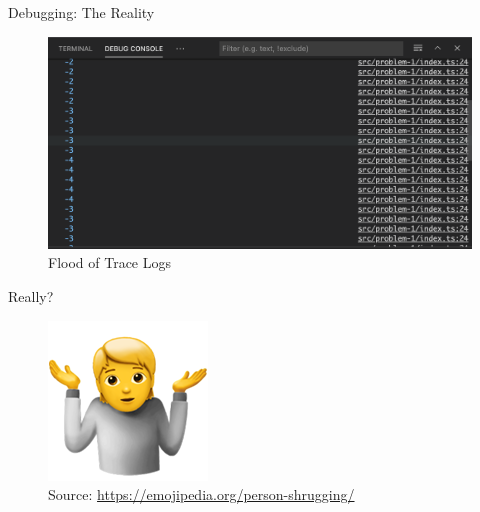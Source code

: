 \documentclass[aspectratio=169]{beamer}
\begin{document}
\begin{frame}[fragile]{Debugging: The Reality}
    \begin{figure}[H]
        \centering
        \includegraphics[height=\textheight/2]{figures/tracelogs.png}
        \caption{Flood of Trace Logs}
    \end{figure}
\end{frame}


\begin{frame}[fragile]{Really?}
    \begin{figure}[H]
        \centering
        \includegraphics[height=\textheight/2]{figures/person-shrugging_1f937.png}
        \caption{\tiny{Source: \url{https://emojipedia.org/person-shrugging/}}}
    \end{figure}
\end{frame}

\end{document}
